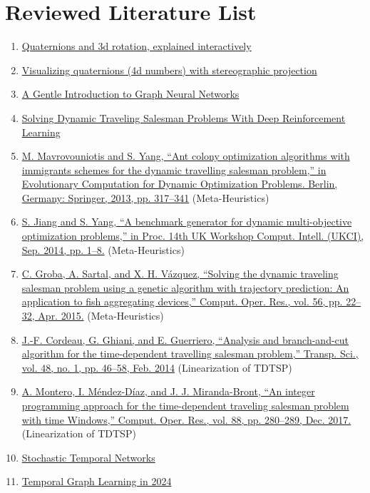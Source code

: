 \section{Reviewed Literature List}
\begin{enumerate}
    \item \href{https://www.youtube.com/watch?v=zjMuIxRvygQ&pp=ygULcXVhdGVybmlvbnM%3D}{Quaternions and 3d rotation, explained interactively}
    \item \href{https://www.youtube.com/watch?v=d4EgbgTm0Bg&pp=ygULcXVhdGVybmlvbnM%3D}{Visualizing quaternions (4d numbers) with stereographic projection}
    \item \href{https://distill.pub/2021/gnn-intro/}{A Gentle Introduction to Graph Neural Networks}
    \item \href{https://pubmed.ncbi.nlm.nih.gov/34520362/}{Solving Dynamic Traveling Salesman Problems With Deep Reinforcement Learning}
    \item \href{}{M. Mavrovouniotis and S. Yang, “Ant colony optimization algorithms with immigrants schemes for the dynamic travelling salesman problem,” in Evolutionary Computation for Dynamic Optimization Problems. Berlin, Germany: Springer, 2013, pp. 317–341} (Meta-Heuristics)
    \item \href{}{S. Jiang and S. Yang, “A benchmark generator for dynamic multi-objective optimization problems,” in Proc. 14th UK Workshop Comput. Intell. (UKCI), Sep. 2014, pp. 1–8.} (Meta-Heuristics)
    \item \href{}{C. Groba, A. Sartal, and X. H. Vázquez, “Solving the dynamic traveling salesman problem using a genetic algorithm with trajectory prediction: An application to fish aggregating devices,” Comput. Oper. Res., vol. 56, pp. 22–32, Apr. 2015.} (Meta-Heuristics)
    \item \href{}{J.-F. Cordeau, G. Ghiani, and E. Guerriero, “Analysis and branch-and-cut algorithm for the time-dependent travelling salesman problem,” Transp. Sci., vol. 48, no. 1, pp. 46–58, Feb. 2014} (Linearization of TDTSP)
    \item \href{}{A. Montero, I. Méndez-Díaz, and J. J. Miranda-Bront, “An integer programming approach for the time-dependent traveling salesman problem with time Windows,” Comput. Oper. Res., vol. 88, pp. 280–289, Dec. 2017.} (Linearization of TDTSP)
    \item \href{https://cnrrobertson.github.io/other/mlseminar/fall_2021/Stochastic%20Temporal%20Networks%20-%20Binan%20Gu.pdf}{Stochastic Temporal Networks}
    \item \href{https://towardsdatascience.com/temporal-graph-learning-in-2024-feaa9371b8e2}{Temporal Graph Learning in 2024}

\end{enumerate}
